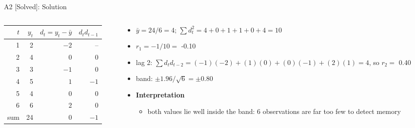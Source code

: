 \begin{frame}{A2 [Solved]: Solution}
\itemsize{\footnotesize}
\begin{columns}[T]
\begin{column}{0.48\textwidth}
\begin{center}
\footnotesize
\begin{tabular}{rrrr}
\toprule
$t$ & $y_t$ & $d_t = y_t - \bar y$ & $d_t d_{t-1}$ \\
\midrule
1 & 2 & $-2$ & -- \\
2 & 4 & $0$ & $0$ \\
3 & 3 & $-1$ & $0$ \\
4 & 5 & $1$ & $-1$ \\
5 & 4 & $0$ & $0$ \\
6 & 6 & $2$ & $0$ \\
\midrule sum & 24 & 0 & $-1$ \\
\bottomrule
\end{tabular}
\end{center}

\end{column}
\begin{column}{0.48\textwidth}
\begin{itemize}
    \item $\bar y = 24/6 = 4$; $\sum d_t^2 = 4 + 0 + 1 + 1 + 0 + 4 = 10$
    \item $r_1 = -1/10 = $ -0.10
    \item lag 2: $\sum d_t d_{t-2} = (-1)(-2) + (1)(0) + (0)(-1) + (2)(1) = 4$, so $r_2 = $ 0.40
    \item band: $\pm 1.96/\sqrt 6 = \pm$0.80
    \item \textbf{Interpretation}
    \begin{itemize}
        \item both values lie well inside the band: 6 observations are far too few to detect memory
    \end{itemize}
\end{itemize}
\end{column}
\end{columns}
\end{frame}

